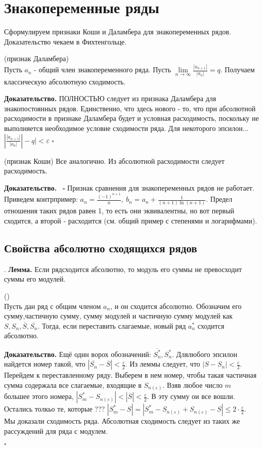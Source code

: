 \section{Знакопеременные ряды}
Сформулируем признаки Коши и Даламбера для знакопеременных рядов.
Доказательство чекаем в Фихтенгольце.
\begin{theor}
    (признак Даламбера)\\
    Пусть $a_n$ - общий член знакопеременного ряда. 
    Пусть  $\lim\limits_{n \to \infty} \frac{|a_{n+1}|}{|a_n|}=q$.
    Получаем классическую абсолютную сходимость. \\

\end{theor}
\textbf{Доказательство.} ПОЛНОСТЬЮ следует из признака Даламбера для 
знакопостоянных рядов. Единственно, что здесь нового - то, что при абсолютной
расходимости в признаке Даламбера будет и условная расходимость, поскольку не 
выполняется необходимое условие сходимости ряда. Для некоторого эпсилон...
$|\frac{|a_{n+1}|}{|a_n|}|-q|<\varepsilon$ 
$\square$ 
\begin{theor}
    (признак Коши) 
    Все аналогично. Из абсолютной расходимости следует расходимость.
\end{theor}
\textbf{Доказательство.}  \
$\square$ 
Признак сравнения для знакопеременных рядов не работает. Приведем 
контрпример: $a_n=\frac{(-1)^{n+1}}{n},~b_n=a_n+\frac{1}{(n+1)\ln(n+1)}$. 
Предел отношения таких рядов равен 1, то есть они эквивалентны, но вот
первый сходится, а второй - расходится (см. общий пример с степенями и 
логарифмами). 
\subsection{Свойства абсолютно сходящихся рядов}.
\textbf{Лемма.} Если рядсходится абсолютно, то модуль его суммы не превосходит
суммы его модулей.
\begin{theor}
    ()\\
    Пусть дан ряд с общим членом $a_n$, и он сходится абсолютно. Обозначим 
    его сумму,частичную сумму, сумму модулей и частичную сумму модулей как
     $S,S_n,\overline{S},\overline{S_n}$. Тогда, если переставить слагаемые, 
     новый ряд $a^*_n$ сходится абсолютно.
\end{theor}
\textbf{Доказательство.} Ещё один ворох обозначений: $\overline{S^*_n},S^*_n$.
Длялюбого эпсилон найдется номер такой, что $|\overline{S_n}-\overline{S}|<
\frac{\varepsilon}{2}$. Из леммы следует, что $|S-S_n|<\frac{\varepsilon}{2}$.
Перейдем к переставленному ряду. Выберем в нем номер, чтобы такая частичная
сумма содержала все слагаемые, входящие в $S_{n(\varepsilon)}$. Взяв 
любое число $m$ большее этого номера,  $|S^*_m-S_{n(\varepsilon)}|<
|\overline{S}|<\frac{\varepsilon}{2}$. В эту сумму ои все вошли. Остались
толкьо те, которые ???
$|S^*_m-S|=|S^*_m-S_{n(\varepsilon)}+S_{n(\varepsilon)}-S|\leqslant 
2\cdot \frac{\varepsilon}{2}$. Мы доказали сходимость ряда.
Абсолютная сходимость следует из таких же рассуждений для ряда с модулем. 


$\square$ 
